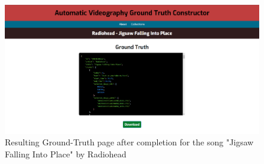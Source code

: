\documentclass{l4proj}
\begin{document}
\begin{appendices}
\begin{figure}
    \centering
    \includegraphics[width=1\textwidth]{figures/walkthrough_ground_truth_page.pdf}
    \caption{Resulting Ground-Truth page after completion for the song "Jigsaw Falling Into Place" by Radiohead}
    \label{fig:walkthrough_ground_truth_page}
\end{figure}


\end{appendices}
\end{document}
